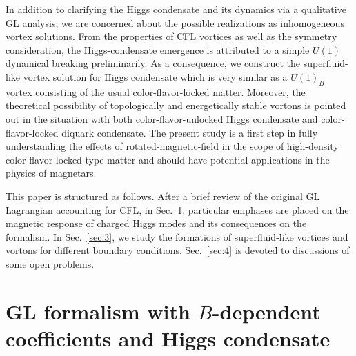 \documentclass[prd, showpacs,nofootinbib,amsmath,amssymb]{revtex4}
\begin{document}
In addition to clarifying the Higgs condensate and its dynamics via a qualitative GL analysis, we are concerned about the possible realizations as inhomogeneous vortex solutions. 
From the properties of CFL vortices as well as the symmetry consideration, the Higgs-condensate emergence is attributed to a simple $U(1)$ dynamical breaking preliminarily. 
As a consequence, we construct the superfluid-like vortex solution for Higgs condensate which is very similar as 
a $U(1)_B$ vortex consisting of the usual color-flavor-locked matter.
Moreover, the theoretical possibility of topologically and energetically stable vortons is pointed out in the situation with both color-flavor-unlocked Higgs condensate and color-flavor-locked diquark condensate.
The present study is a first step in fully understanding the effects of rotated-magnetic-field in the scope of high-density color-flavor-locked-type matter and should have potential applications in the physics of magnetars.

This paper is structured as follows. After a brief review of the original GL Lagrangian accounting for CFL, in
Sec.~\ref{sec:2}, particular emphases are placed on the magnetic response of charged Higgs modes and its
consequences on the formalism. In Sec.~\ref{sec:3}, we study the formations of superfluid-like vortices and vortons 
for different boundary conditions. Sec.~\ref{sec:4} is devoted to discussions of some open problems.

\section{\bf GL formalism with $B$-dependent coefficients and Higgs condensate }
\label{sec:2}
\vspace{0.2cm}
\end{document}

